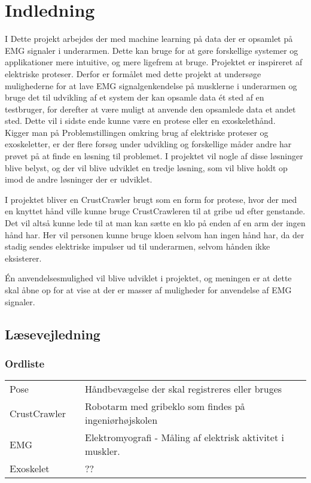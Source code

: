 \thispagestyle{fancy}
\chapter{Indledning}
\label{chp:indledning}
I Dette projekt arbejdes der med machine learning på data der er opsamlet på EMG signaler i underarmen. Dette kan bruge for at gøre forskellige systemer og applikationer mere intuitive, og mere ligefrem at bruge. Projektet er inspireret af elektriske proteser. Derfor er formålet med dette projekt at undersøge mulighederne for at lave EMG signalgenkendelse på musklerne i underarmen og bruge det til udvikling af et system der kan opsamle data ét sted af en testbruger, for derefter at være muligt at anvende den opsamlede data et andet sted. Dette vil i sidste ende kunne være en protese eller en exoskelethånd.\\

Kigger man på Problemstillingen omkring brug af elektriske proteser og exoskeletter, er der flere forsøg under udvikling og forskellige måder andre har prøvet på at finde en løsning til problemet. I projektet vil nogle af disse løsninger blive belyst, og der vil blive udviklet en tredje løsning, som vil blive holdt op imod de andre løsninger der er udviklet.

I projektet bliver en CrustCrawler brugt som en form for protese, hvor der med en knyttet hånd ville kunne bruge CrustCrawleren til at gribe ud efter genstande. Det vil altså kunne lede til at man kan sætte en klo på enden af en arm der ingen hånd har. Her vil personen kunne bruge kloen selvom han ingen hånd har, da der stadig sendes elektriske impulser ud til underarmen, selvom hånden ikke eksisterer.

Én anvendelsesmulighed vil blive udviklet i projektet, og meningen er at dette skal åbne op for at vise at der er masser af muligheder for anvendelse af EMG signaler.
\section{Læsevejledning}
\subsection*{Ordliste}
\begin{tabular}{lll}
	Pose && Håndbevægelse der skal registreres eller bruges\\
	CrustCrawler && Robotarm med gribeklo som findes på ingeniørhøjskolen\\
	EMG && Elektromyografi - Måling af elektrisk aktivitet i muskler.\\
	Exoskelet && ??
\end{tabular}
